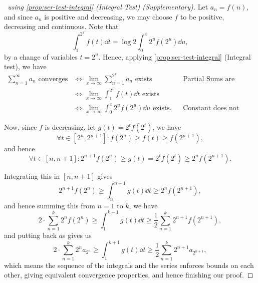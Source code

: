 \documentclass[11pt]{article}
\numberwithin{equation}{section}
\theoremstyle{definition}
\theoremstyle{remark}
\newcommand{\pqty}[1]{\left(#1\right)}
\newcommand{\ccintv}[2]{[#1,#2]}
\begin{document}
\begin{proof}[\proofname\ using \autoref{prop:ser-test-integral} (Integral Test) (Supplementary)]
    Let \(a_n = f\pqty{n}\), and since \(a_n\) is positive and decreasing, we may choose \(f\) to be positive, decreasing and continuous. Note that
    \[
        \int_{1}^{2^x} f\pqty{t} \dd{t} = \log 2 \int_{0}^{x} 2^u f\pqty{2^u} \dd{u},
    \]
    by a change of variables \(t = 2^u\). Hence, applying \autoref{prop:ser-test-integral} (Integral test), we have
    \begin{align*}
        \sum_{n = 1}^{\infty} a_n \text{ converges} &\iff \lim_{x \to \infty} \sum_{n = 1}^{2^x} a_n \text{ exists} && \text{Partial Sums are Monotone}\\
        &\iff \lim_{x \to \infty} \int_{1}^{2^x} f\pqty{t} \dd{t} \text{ exists} \\
        &\iff \lim_{x \to \infty} \int_{0}^{x} 2^u f\pqty{2^u} \dd{u} \text{ exists.} && \text{Constant does not affect Convergence}
    \end{align*}

    Now, since \(f\) is decreasing, let \(g\pqty{t} = 2^t f\pqty{2^t}\), we have
    \[
        \forall t \in \ccintv{2^n}{2^{n + 1}}: f\pqty{2^n} \geq f\pqty{t} \geq f\pqty{2^{n + 1}},
    \]
    and hence
    \[
        \forall t \in \ccintv{n}{n + 1}: 2^{n + 1} f\pqty{2^n} \geq g\pqty{t} = 2^t f\pqty{2^t} \geq 2^n f\pqty{2^{n + 1}}.
    \]

    Integrating this in \(\ccintv{n}{n + 1}\) gives
    \[
        2^{n + 1} f\pqty{2^n} \geq \int_{n}^{n + 1} g\pqty{t} \dd{t} \geq 2^n f\pqty{2^{n + 1}},
    \]
    and hence summing this from \(n = 1\) to \(k\), we have
    \[
        2 \cdot \sum_{n = 1}^{k} 2^n f\pqty{2^n} \geq \int_{1}^{k + 1} g\pqty{t} \dd{t} \geq \frac{1}{2} \sum_{n = 1}^{k} 2^{n + 1} f\pqty{2^{n + 1}},
    \]
    and putting back \(a\)s gives us
    \[
        2 \cdot \sum_{n = 1}^{k} 2^n a_{2^n} \geq \int_{1}^{k + 1} g\pqty{t} \dd{t} \geq \frac{1}{2} \sum_{n = 1}^{k} 2^{n + 1} a_{2^{n + 1}},
    \]
    which means the sequence of the integrals and the series enforces bounds on  each other, giving equivalent convergence properties, and hence finishing our proof.
\end{proof}
\end{document}
